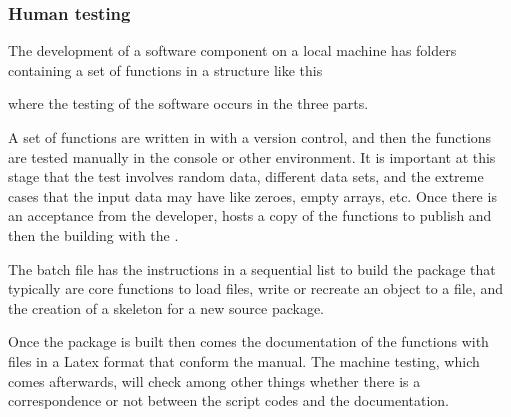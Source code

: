 \documentclass[a4paper,12pt,english]{sphinxhowto}
\begin{document}


\subsubsection{Human testing}
\label{\detokenize{UAT:human-testing}}
The development of a software component on a local machine has folders
containing a set of functions in a structure like this

\begin{sphinxVerbatim}[commandchars=\\\{\},formatcom=\footnotesize]
   
\end{sphinxVerbatim}

where the testing of the software occurs in the three parts.

A set of  functions are written in
 with a version control, and then the functions are tested
manually in the  console or other
environment. It is important at this stage that the test involves random
data, different data sets, and the extreme cases that the input data may
have like zeroes, empty arrays, etc. Once there is an acceptance from the
developer,  hosts a copy of the functions to publish and then
the building with the .

The batch file has the instructions in a sequential list to build the
package that typically are  core functions to load files, write or
recreate an object to a file, and the creation of a skeleton for a new
source package.

Once the package is built then comes the documentation of the functions
with files in a Latex format that conform the manual. The machine
testing, which comes afterwards, will check among other things whether
there is a correspondence or not between the script codes and the
documentation.

\end{document}
